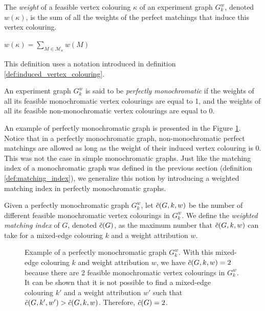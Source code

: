 \begin{definition}
    \label{def:vertex_colouring_weight}
    The \textit{weight} of a feasible vertex colouring $\kappa$ of an experiment graph $G_k^w$, denoted $w(\kappa)$, is the sum of all the weights of the perfect matchings that induce this vertex colouring.
    
    \begin{center}
        $w(\kappa) = \sum\limits_{M \in \mathcal{M}_{\kappa}} w(M)$
    \end{center}

    This definition uses a notation introduced in definition \ref{def:induced_vertex_colouring}.
\end{definition}

\begin{definition}
    \label{def:perfectly_monochromatic_graph}
    An experiment graph $G_k^w$ is said to be \textit{perfectly monochromatic} if the weights of all its feasible monochromatic vertex colourings are equal to 1, and the weights of all its feasible non-monochromatic vertex colourings are equal to 0.
\end{definition}

An example of perfectly monochromatic graph is presented in the Figure \ref{fig:perfectly_mono}. Notice that in a perfectly monochromatic graph, non-monochromatic perfect matchings are allowed as long as the weight of their induced vertex colouring is 0. This was not the case in simple monochromatic graphs. Just like the matching index of a monochromatic graph was defined in the previous section (definition \ref{def:matching_index}), we generalize this notion by introducing a weighted matching index in perfectly monochromatic graphs.

\begin{definition}
    \label{def:weighted_matching_index}
    Given a perfectly monochromatic graph $G_k^w$, let $\Tilde{c}(G, k, w)$ be the number of different feasible monochromatic vertex colourings in $G_k^w$. We define the \textit{weighted matching index} of $G$, denoted $\Tilde{c}(G)$, as the maximum number that $\Tilde{c}(G, k, w)$ can take for a mixed-edge colouring $k$ and a weight attribution $w$.
\end{definition}

\begin{figure}[H]
    \caption{Example of a perfectly monochromatic graph $G_k^w$. With this mixed-edge colouring $k$ and weight attribution $w$, we have $\Tilde{c}(G, k, w) = 2$ because there are 2 feasible monochromatic vertex colourings in $G_k^w$. It can be shown that it is not possible to find a mixed-edge colouring $k'$ and a weight attribution $w'$ such that $\Tilde{c}(G, k', w') > \Tilde{c}(G, k, w)$. Therefore, $\Tilde{c}(G) = 2$.}
    \label{fig:perfectly_mono}
\end{figure}

